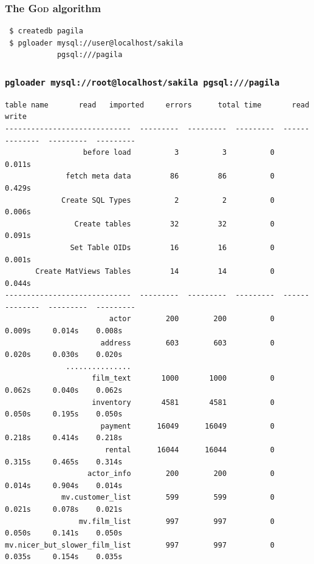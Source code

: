 \documentclass{beamer}
\begin{document}
\begin{frame}[fragile]
  \frametitle{The \textsc{God} algorithm}

\begin{verbatim}
 $ createdb pagila
 $ pgloader mysql://user@localhost/sakila
            pgsql:///pagila
\end{verbatim}
\end{frame}

\begin{frame}[fragile]
  \frametitle{\small{\texttt{pgloader mysql://root@localhost/sakila pgsql:///pagila}}}

\begin{Verbatim}[fontsize=\tiny]
                   table name       read   imported     errors      total time       read      write
-----------------------------  ---------  ---------  ---------  --------------  ---------  ---------
                  before load          3          3          0          0.011s                     
              fetch meta data         86         86          0          0.429s                     
             Create SQL Types          2          2          0          0.006s                     
                Create tables         32         32          0          0.091s                     
               Set Table OIDs         16         16          0          0.001s                     
       Create MatViews Tables         14         14          0          0.044s                     
-----------------------------  ---------  ---------  ---------  --------------  ---------  ---------
                        actor        200        200          0          0.009s     0.014s    0.008s
                      address        603        603          0          0.020s     0.030s    0.020s
              ...............
                    film_text       1000       1000          0          0.062s     0.040s    0.062s
                    inventory       4581       4581          0          0.050s     0.195s    0.050s
                      payment      16049      16049          0          0.218s     0.414s    0.218s
                       rental      16044      16044          0          0.315s     0.465s    0.314s
                   actor_info        200        200          0          0.014s     0.904s    0.014s
             mv.customer_list        599        599          0          0.021s     0.078s    0.021s
                 mv.film_list        997        997          0          0.050s     0.141s    0.050s
mv.nicer_but_slower_film_list        997        997          0          0.035s     0.154s    0.035s

\end{Verbatim}
\end{frame}
\end{document}
